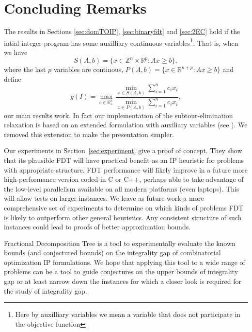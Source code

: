 \section{Concluding Remarks}

The results in Sections \ref{sec:domTOIP}, \ref{sec:binaryfdt}  and \ref{sec:2EC} hold if the intial integer program has some auxilliary continuous variables\footnote{Here by auxilliary variables we mean a variable that does not participate in the objective function}. That is, when we have 
\begin{equation*}
S(A,b) = \{x\in \mathbb{Z}^n\times \mathbb{R}^p: Ax\geq b\},
\end{equation*}
where the last $p$ variables are continous, $P(A,b) = \{x\in \mathbb{R}^{n+p}: Ax\geq b\}$
and define
\begin{equation*}
g(I) = \max_{c\in \mathbb{R}^n_+}\frac{\min_{x\in S(A,b)} \sum_{i=1}^{n}c_ix_i}{\min_{x\in P(A,b)} \sum_{i=1}^{n}c_ix_i},
\end{equation*}
our main results work. In fact our implementation of the subtour-elimination relaxation is based on an extended formulation with auxiliary variables (see \cite{subtour-extended}). We removed this extension to make the presentation simpler.

Our experiments in Section~\ref{sec:experiment} give a proof of concept. They show that its plausible FDT will have practical benefit as an IP heuristic for problems with appropriate structure. FDT performance will likely improve in a future more high-performance version coded in C or C++, perhaps able to take advantage of the low-level parallelism available on all modern platforms (even laptops).  This will allow tests on larger instances. We leave as future work a more comprehensive set of experiments to determine on which kinds of problems FDT is likely to outperform other general heuristics. Any consistent structure of such instances could lead to proofs of better approximation bounds.

Fractional Decomposition Tree is a tool to experimentally evaluate the known bounds (and conjectured bounds) on the integrality gap of combinatorial optimization IP formulations. We hope that applying this tool to a wide range of problems can be a tool to guide conjectures on the upper bounds of integrality gap or at least narrow down the instances for which a closer look is required for the study of integrality gap.


